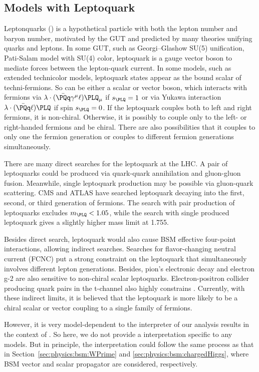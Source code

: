 \FloatBarrier


\subsection{Models with Leptoquark}
\label{sec:physics:bsm:leptoquark}


Leptonquarks (\PLQ) is a hypothetical particle with both the lepton number and baryon number, motivated by the GUT and predicted by many theories unifying quarks and leptons. In some GUT, such as Georgi–Glashow SU(5) unification, Pati-Salam model with SU(4) color, leptoquark is a gauge vector boson to mediate forces between the lepton-quark current. In some models, such as extended technicolor models, leptoquark states appear as the bound scalar of techni-fermions. So \PLQ can be either a scalar or vector boson, which interacts with fermions via $\lambda \cdot (\bar{\PQq} \gamma^\mu \ell) \PLQ_\mu$ if $s_{\PLQ}=1$ or via Yukawa interaction $\lambda \cdot (\bar{\PQq}\ell) \PLQ $ if spin $s_{\PLQ}=0$. If the leptoquark couples both to left and right fermions, it is non-chiral. Otherwise, it is possibly to couple only to the left- or right-handed fermions and be chiral. There are also possibilities that it couples to only one the fermion generation or couples to different fermion generations simultaneously. 

There are many direct searches for the leptoquark at the LHC. A pair of leptoquarks could be produced via quark-quark annihilation and gluon-gluon fusion. Meanwhile, single leptoquark production may be possible via gluon-quark scattering. CMS and ATLAS have searched leptoquark decaying into the first, second, or third generation of fermions. The search with pair production of leptoquarks excludes $m_{\PLQ}<1.05$\TeV, while the search with single produced leptoquark gives a slightly higher mass limit at 1.755\TeV. 

Besides direct search, leptoquark would also cause BSM effective four-point interactions, allowing indirect searches. Searches for flavor-changing neutral current (FCNC) put a strong constraint on the leptoquark that simultaneously involves different lepton generations. Besides, pion's electronic decay and electron g-2 are also sensitive to non-chiral scalar leptoquarks. Electron-positron collider producing quark pairs in the t-channel also highly constrains \PLQ.  Currently, with these indirect limits, it is believed that the leptoquark is more likely to be a chiral scalar or vector coupling to a single family of fermions.

However, it is very model-dependent to the interpreter of our analysis results in the context of \PLQ. So here, we do not provide a interpretation specific to any \PLQ models. But in principle, the interpretation could follow the same process as that in Section~\ref{sec:physics:bsm:WPrime} and \ref{sec:physics:bsm:chargedHiggs}, where BSM vector and scalar propagator are considered, respectively.



